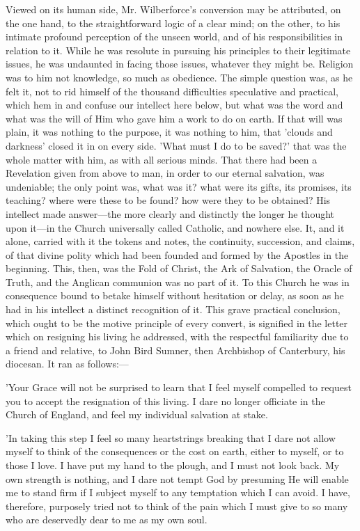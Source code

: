 Viewed on its human side, Mr. Wilberforce's
conversion may be attributed, on the one hand, to the straightforward
logic of a clear mind; on the other, to his intimate profound
perception of the unseen world, and of his responsibilities in
relation to it. While he was resolute in pursuing his principles to
their legitimate issues, he was undaunted in facing those issues,
whatever they might be. Religion was to him not knowledge, so much as
obedience. The simple question was, as he felt it, not to rid himself
of the thousand difficulties speculative and practical, which hem in
and confuse our intellect here below, but what was the word and what
was the will of Him who gave him a work to do on earth. If that
will was plain, it was nothing to the purpose, it was nothing to him,
that 'clouds and darkness' closed it in on every side. 'What
must I do to be saved?' that was the whole matter with him, as with
all serious minds. That there had been a Revelation given from above
to man, in order to our eternal salvation, was undeniable; the only
point was, what was it? what were its gifts, its promises, its
teaching? where were these to be found? how were they to be obtained?
His intellect made answer—the more clearly and distinctly the longer
he thought upon it—in the Church universally called Catholic, and
nowhere else. It, and it alone, carried with it the tokens and notes,
the continuity, succession, and claims, of that divine polity which
had been founded and formed by the Apostles in the beginning. This,
then, was the Fold of Christ, the Ark of Salvation, the Oracle of
Truth, and the Anglican communion was no part of it. To this Church he
was in consequence bound to betake himself without hesitation or
delay, as soon as he had in his intellect a distinct recognition of
it. This grave practical conclusion, which ought to be the motive
principle of every convert, is signified in the letter which on
resigning his living he addressed, with the respectful familiarity due
to a friend and relative, to John Bird Sumner, then Archbishop of
Canterbury, his diocesan. It ran as follows:—

'Your Grace will not be surprised to learn that
I feel myself compelled to request you to accept the resignation of
this living. I dare no longer officiate in the Church of England, and
feel my individual salvation at stake.

'In taking this step I feel so many heartstrings
breaking that I dare not allow myself to think of the
consequences or the cost on earth, either to myself, or to those I
love. I have put my hand to the plough, and I must not look back. My
own strength is nothing, and I dare not tempt God by presuming He will
enable me to stand firm if I subject myself to any temptation which I
can avoid. I have, therefore, purposely tried not to think of the pain
which I must give to so many who are deservedly dear to me as my own
soul.

